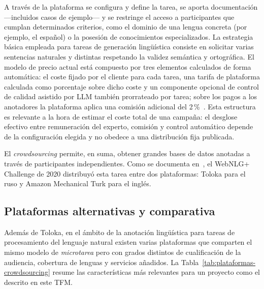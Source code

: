A través de la plataforma se configura y define la tarea, se aporta
documentación ---incluidos casos de ejemplo--- y se restringe el acceso a
participantes que cumplan determinados criterios, como el dominio de una lengua
concreta (por ejemplo, el español) o la posesión de conocimientos
especializados. La estrategia básica empleada para tareas de generación
lingüística consiste en solicitar varias sentencias naturales y distintas
respetando la validez semántica y ortográfica. El modelo de precio actual está
compuesto por tres elementos calculados de forma automática: el coste fijado
por el cliente para cada tarea, una tarifa de plataforma calculada como
porcentaje sobre dicho coste y un componente opcional de control de calidad
asistido por LLM también prorrateado por tarea; sobre los pagos a los
anotadores la plataforma aplica una comisión adicional del
2\,\%~\cite{TolokaPricing}. Esta estructura es relevante a la hora de estimar
el coste total de una campaña: el desglose efectivo entre remuneración del
experto, comisión y control automático depende de la configuración elegida y no
obedece a una distribución fija publicada.

El \textit{crowdsourcing} permite, en suma, obtener grandes bases de datos
anotadas a través de participantes independientes. Como se documenta
en~\cite{CastroFerreira2020}, el WebNLG+ Challenge de 2020 distribuyó esta
tarea entre dos plataformas: Toloka para el ruso y Amazon Mechanical Turk para
el inglés.

\subsection{Plataformas alternativas y comparativa}
\label{sec:crowdsourcing-alternativas}

Además de Toloka, en el ámbito de la anotación lingüística para tareas de
procesamiento del lenguaje natural existen varias plataformas que comparten el
mismo modelo de \textit{microtarea} pero con grados distintos de cualificación
de la audiencia, cobertura de lenguas y servicios añadidos. La
Tabla~\ref{tab:plataformas-crowdsourcing} resume las características más
relevantes para un proyecto como el descrito en este TFM.

